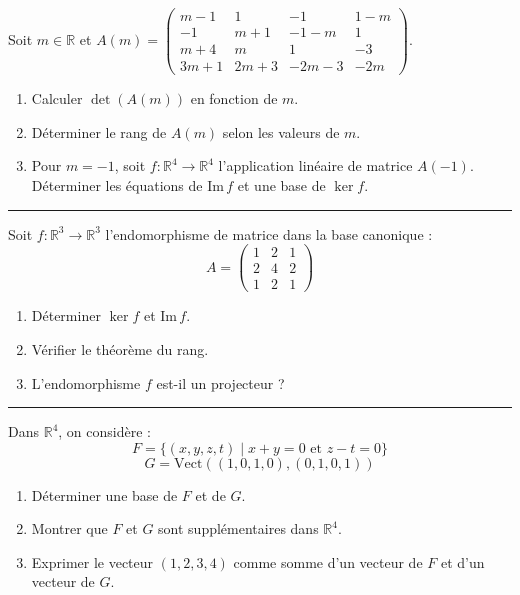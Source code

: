 \documentclass[../PolyS4.tex]{subfiles}
\begin{document}

Soit $m \in \mathbb{R}$ et $A(m) = \begin{pmatrix} m-1 & 1 & -1 & 1-m \\ -1 & m+1 & -1-m & 1 \\ m+4 & m & 1 & -3 \\ 3m+1 & 2m+3 & -2m-3 & -2m \end{pmatrix}$.
\begin{enumerate}
    \item Calculer $\det(A(m))$ en fonction de $m$.
    \item Déterminer le rang de $A(m)$ selon les valeurs de $m$.
    \item Pour $m = -1$, soit $f : \mathbb{R}^4 \to \mathbb{R}^4$ l'application linéaire de matrice $A(-1)$.\\
    Déterminer les équations de $\text{Im}\, f$ et une base de $\ker f$.
\end{enumerate}

\vspace{1em}
\hrule
\vspace{1em}


Soit $f : \mathbb{R}^3 \to \mathbb{R}^3$ l'endomorphisme de matrice dans la base canonique :
$$A = \begin{pmatrix} 1 & 2 & 1 \\ 2 & 4 & 2 \\ 1 & 2 & 1 \end{pmatrix}$$
\begin{enumerate}
    \item Déterminer $\ker f$ et $\text{Im}\, f$.
    \item Vérifier le théorème du rang.
    \item L'endomorphisme $f$ est-il un projecteur ?
\end{enumerate}

\vspace{1em}
\hrule
\vspace{1em}


Dans $\mathbb{R}^4$, on considère :
$$F = \{(x, y, z, t) \mid x + y = 0 \text{ et } z - t = 0\}$$
$$G = \text{Vect}((1, 0, 1, 0), (0, 1, 0, 1))$$
\begin{enumerate}
    \item Déterminer une base de $F$ et de $G$.
    \item Montrer que $F$ et $G$ sont supplémentaires dans $\mathbb{R}^4$.
    \item Exprimer le vecteur $(1, 2, 3, 4)$ comme somme d'un vecteur de $F$ et d'un vecteur de $G$.
\end{enumerate}
\end{document}
